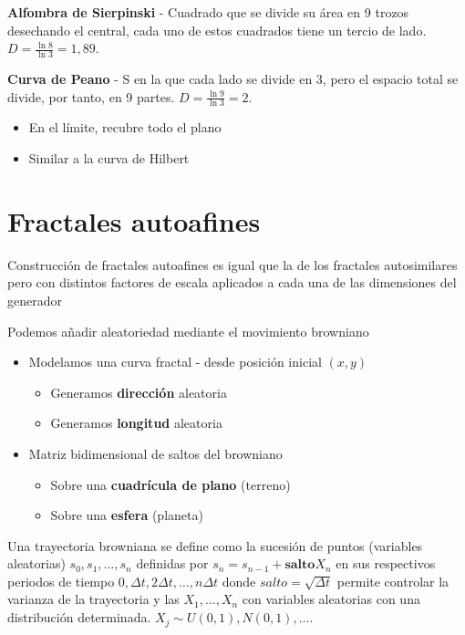 \textbf{Alfombra de Sierpinski} - Cuadrado que se divide su área en 9 trozos desechando el central, cada uno de estos cuadrados tiene un tercio de lado. $D=\frac{\ln 8}{\ln 3}=1,89$.

\textbf{Curva de Peano} - S en la que cada lado se divide en 3, pero el espacio total se divide, por tanto, en 9 partes. $D=\frac{\ln 9}{\ln 3}=2$.
\begin{itemize}
    \item En el límite, recubre todo el plano
    \item Similar a la curva de Hilbert
\end{itemize}

\section{Fractales autoafines}
Construcción de fractales autoafines es igual que la de los fractales autosimilares pero con distintos factores de escala aplicados a cada una de las dimensiones del generador

Podemos añadir aleatoriedad mediante el movimiento browniano
\begin{itemize}
    \item Modelamos una curva fractal - desde posición inicial $(x, y)$
    \begin{itemize}
        \item Generamos \textbf{dirección} aleatoria
        \item Generamos \textbf{longitud} aleatoria
    \end{itemize}
    \item Matriz bidimensional de saltos del browniano
    \begin{itemize}
        \item Sobre una \textbf{cuadrícula de plano} (terreno)
        \item Sobre una \textbf{esfera} (planeta)
    \end{itemize}
\end{itemize}

Una trayectoria browniana se define como la sucesión de puntos (variables aleatorias) $s_0, s_1, \ldots, s_n$ definidas por $s_n = s_{n-1} + \textbf{salto} X_n$ en sus respectivos periodos de tiempo $0, \Delta t, 2\Delta t, \ldots, n\Delta t$ donde $\textit{salto}=\sqrt{\Delta t}$ permite controlar la varianza de la trayectoria y las $X_1, \ldots, X_n$ con variables aleatorias con una distribución determinada. $X_j \sim U(0,1), N(0,1), \ldots$.

